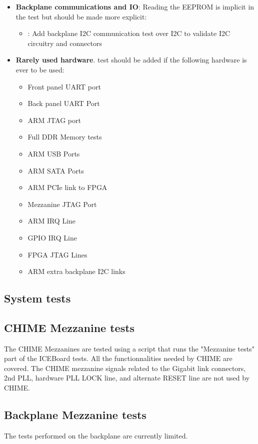 \documentclass[11pt,article]{memoir}
\begin{document}
\begin{itemize}
\item \textbf{Backplane communications and IO}: Reading the EEPROM is implicit in the test but should be made more explicit:
	\begin{itemize}
	\item: Add backplane I2C communication test over I2C to validate I2C circuitry and connectors
	\end{itemize}

\item \textbf{Rarely used hardware}. test should be added if the following hardware is ever to be used:
	\begin{itemize}
	\item Front panel UART port
	\item Back panel UART Port
	\item ARM JTAG port
	\item Full DDR Memory tests
	\item ARM USB Ports
	\item ARM SATA Ports
	\item ARM PCIe link to FPGA
	\item Mezzanine JTAG Port
	\item ARM IRQ Line
	\item GPIO IRQ Line
	\item FPGA JTAG Lines
	\item ARM extra backplane I2C links
	\end{itemize}
\end{itemize}


\subsection{System tests}


\subsection{CHIME Mezzanine tests}
The CHIME Mezzanines are tested using a script that runs the  "Mezzanine tests" part of the ICEBoard tests. All the functionnalities needed by CHIME are covered. The CHIME mezzanine signals related to the Gigabit link connectors, 2nd PLL, hardware PLL LOCK line, and alternate RESET line are not used by CHIME.

\subsection{Backplane Mezzanine tests}
The tests performed on the backplane are currently limited.
\end{document}
